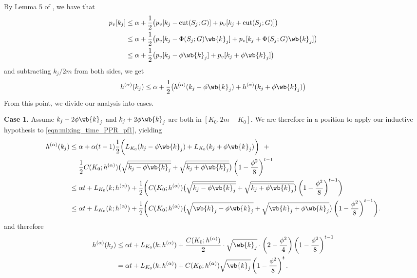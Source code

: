 \documentclass[twoside,11pt]{article}
\newcommand{\1}{\mathbf{1}}
\begin{document}
By Lemma 5 of \citet{andersen2006}, we have that
\begin{align}
p_v[k_j] & \leq \alpha + \frac{1}{2} \bigl(p_v[k_j - \mathrm{cut}(S_j;G)] + p_v[k_j + \mathrm{cut}(S_j;G)] \bigr) \nonumber\\
& \leq \alpha + \frac{1}{2} \bigl(p_v[k_j - \Phi(S_j;G) \wb{k}_j] + p_v[k_j + \Phi(S_j;G) \wb{k}_j]  \bigr) \nonumber \\
& \leq \alpha + \frac{1}{2} \bigl(p_v[k_j - \phi \wb{k}_j] + p_v[k_j + \phi \wb{k}_j]\bigr) \nonumber
\end{align}
and subtracting $k_j/2m$ from both sides, we get
\begin{equation}
\label{eqn:mixing_time_PPR_pf1}
h^{(\alpha)}(k_j) \leq \alpha + \frac{1}{2} \bigl(h^{(\alpha)}(k_j - \phi \wb{k}_j) + h^{(\alpha)}(k_j +  \phi \wb{k}_j) \bigr)
\end{equation}
From this point, we divide our analysis into cases. 

\textbf{Case 1.}
Assume $k_j - 2 \phi \wb{k}_j$ and $k_j + 2 \phi \wb{k}_j$ are both in $[K_0,2m  - K_0]$. We are therefore in a position to apply our inductive hypothesis to \eqref{eqn:mixing_time_PPR_pf1}, yielding
\begin{align*}
h^{(\alpha)}(k_j) & \leq \alpha + \alpha(t-1) \frac{1}{2}\biggl(L_{K_0}(k_j - \phi \wb{k}_j) + L_{K_0}(k_j + \phi \wb{k}_j)\biggr) ~~+ \\
& \quad~ \frac{1}{2}C(K_0;h^{(\alpha)})\bigl(\sqrt{\overline{k_j - \phi \wb{k}_j}} + \sqrt{\overline{k_j + \phi \wb{k}_j}}\bigr)\left(1 - \frac{\phi^2}{8}\right)^{t-1} \\
& \leq \alpha t + L_{K_0}(k;h^{(\alpha)}) + \frac{1}{2}\biggl(C(K_0;h^{(\alpha)})\bigl(\sqrt{\overline{k_j - \phi \wb{k}_j}} + \sqrt{\overline{k_j + \phi \wb{k}_j}}\bigr)\left(1 - \frac{\phi^2}{8}\right)^{t-1} \biggr) \\
& \leq \alpha t + L_{K_0}(k;h^{(\alpha)}) + \frac{1}{2}\biggl(C(K_0;h^{(\alpha)})\bigl(\sqrt{\wb{k}_j - \phi \wb{k}_j} + \sqrt{\wb{k}_j + \phi \wb{k}_j}\bigr)\left(1 - \frac{\phi^2}{8}\right)^{t-1} \biggr).
\end{align*}
and therefore
\begin{align*}
h^{(\alpha)}(k_j) & \leq  \alpha t + L_{K_0}(k;h^{(\alpha)}) + \frac{C(K_0;h^{(\alpha)})}{2}\cdot \sqrt{\wb{k}_j}\cdot\left(2 - \frac{\phi^2}{4}\right)\left(1 - \frac{\phi^2}{8}\right)^{t-1} \\
& = \alpha t + L_{K_0}(k;h^{(\alpha)}) + C(K_0;h^{(\alpha)})\sqrt{\wb{k}_j}\left(1 - \frac{\phi^2}{8}\right)^{t}.
\end{align*}
\end{document}
